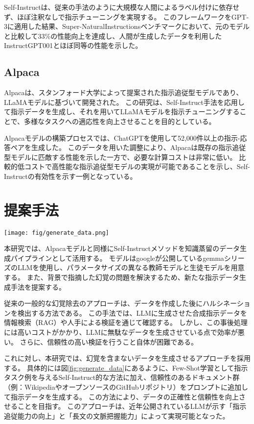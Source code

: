 \documentclass[twocolumn]{jsarticle}
\begin{document}
Self-Instructは、従来の手法のように大規模な人間によるラベル付けに依存せず、ほぼ注釈なしで指示チューニングを実現する。
このフレームワークをGPT-3に適用した結果、Super-NaturalInstructionsベンチマーク\cite{Super-NaturalInstructions}において、元のモデルと比較して33\%の性能向上を達成し、人間が生成したデータを利用したInstructGPT001\cite{InstructGPT}とほぼ同等の性能を示した。

\subsection{Alpaca}
Alpaca\cite{Alpaca}は、スタンフォード大学によって提案された指示追従型モデルであり、LLaMAモデル\cite{Llama}に基づいて開発された。
この研究は、Self-Instruct手法を応用して指示データを生成し、それを用いてLLaMAモデルを指示チューニングすることで、多様なタスクへの適応性を向上させることを目的としている。

Alpacaモデルの構築プロセスでは、ChatGPTを使用して52,000件以上の指示-応答ペアを生成した。
このデータを用いた調整により、Alpacaは既存の指示追従型モデルに匹敵する性能を示した一方で、必要な計算コストは非常に低い。
比較的低コストで高性能な指示追従型モデルの実現が可能であることを示し、Self-Instructの有効性を示す一例となっている。


\section{提案手法}
\begin{figure*}[t]
    \centering
    \texttt{[image: fig/generate\_data.png]}
    \caption{提案手法を用いた生成例}
    \label{fig:generate_data}
\end{figure*}

本研究では、Alpacaモデルと同様にSelf-Instructメソッドを知識蒸留のデータ生成パイプラインとして活用する。
モデルはgoogleが公開しているgemmaシリーズ\cite{Gemma2}のLLMを使用し、パラメータサイズの異なる教師モデルと生徒モデルを用意する。
また、背景で指摘した幻覚の問題を解決するため、新たな指示データ生成手法を提案する。

従来の一般的な幻覚除去のアプローチは、データを作成した後にハルシネーションを検出する方法である。
この手法では、LLMに生成させた合成指示データを情報検索（RAG）や人手による検証を通じて確認する。
しかし、この事後処理には高いコストがかかり、LLMに無駄なデータを生成させている点で効率が悪い。
さらに、信頼性の高い検証を行うこと自体が困難である。

これに対し、本研究では、幻覚を含まないデータを生成させるアプローチを採用する。
具体的には図\ref{fig:generate_data}にあるように、Few-Shot学習として指示タスク例を与えるSelf-Instruct的な方法に加え、信頼性のあるドキュメント群（例：WikipediaやオープンソースのGitHubリポジトリ）をプロンプトに追加して指示データを生成する。
この方法により、データの正確性と信頼性を向上させることを目指す。
このアプローチは、近年公開されているLLMが示す「指示追従能力の向上」と「長文の文脈把握能力」によって実現可能となった。
\end{document}
